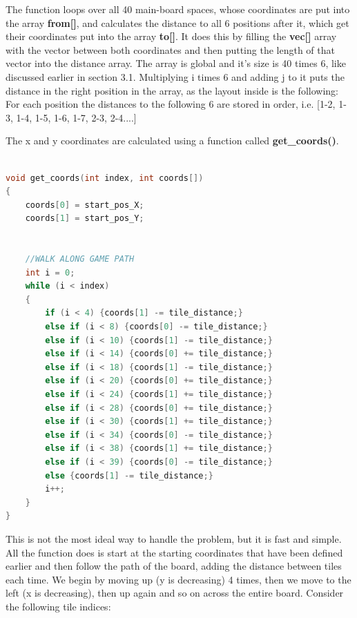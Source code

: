 \documentclass[12pt]{article}
\begin{document}
The function loops over all 40 main-board spaces, whose coordinates are put into the array \textbf{from[]}, and calculates the distance to all 6 positions after it, which get their coordinates put into the array \textbf{to[]}. It does this by filling the \textbf{vec[]} array with the vector between both coordinates and then putting the length of that vector into the distance array. The array is global and it's size is 40 times 6, like discussed earlier in section 3.1. Multiplying i times 6 and adding j to it puts the distance in the right position in the array, as the layout inside is the following:
For each position the distances to the following 6 are stored in order, i.e. [1-2, 1-3, 1-4, 1-5, 1-6, 1-7, 2-3, 2-4....]
\linebreak

The x and y coordinates are calculated using a function called \textbf{get\_coords()}.
\linebreak

\begin{lstlisting}[language=C, caption={Distance calculation}, label={lst:distance calculation}]

void get_coords(int index, int coords[])
{
    coords[0] = start_pos_X;
    coords[1] = start_pos_Y;


    //WALK ALONG GAME PATH
    int i = 0;
    while (i < index)
    {    
        if (i < 4) {coords[1] -= tile_distance;}
        else if (i < 8) {coords[0] -= tile_distance;}
        else if (i < 10) {coords[1] -= tile_distance;}
        else if (i < 14) {coords[0] += tile_distance;}
        else if (i < 18) {coords[1] -= tile_distance;}
        else if (i < 20) {coords[0] += tile_distance;}
        else if (i < 24) {coords[1] += tile_distance;}
        else if (i < 28) {coords[0] += tile_distance;}
        else if (i < 30) {coords[1] += tile_distance;}
        else if (i < 34) {coords[0] -= tile_distance;}
        else if (i < 38) {coords[1] += tile_distance;}
        else if (i < 39) {coords[0] -= tile_distance;}
        else {coords[1] -= tile_distance;}
        i++;
    }
}
\end{lstlisting}

This is not the most ideal way to handle the problem, but it is fast and simple. All the function does is start at the starting coordinates that have been defined earlier and then follow the path of the board, adding the distance between tiles each time. We begin by moving up (y is decreasing) 4 times, then we move to the left (x is decreasing), then up again and so on across the entire board.
Consider the following tile indices:
\end{document}
